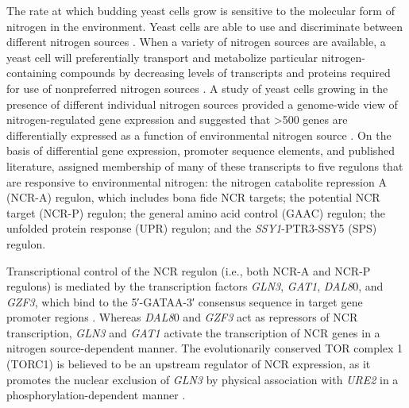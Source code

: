 The rate at which budding yeast cells grow is sensitive to the
molecular form of nitrogen in the environment. Yeast cells are able to
use and discriminate between different nitrogen sources 
\parencite{cooper1982nitrogen,magasanik2002nitrogen}. 
When a variety of nitrogen sources are
available, a yeast cell will preferentially transport and metabolize
particular nitrogen-containing compounds by decreasing levels of
transcripts and proteins required for use of nonpreferred nitrogen
sources 
\parencite{cooper1982nitrogen,magasanik2002nitrogen}. 
A study of yeast
cells growing in the presence of different individual nitrogen sources
provided a genome-wide view of nitrogen-regulated gene expression and
suggested that >500 genes are differentially expressed as a function
of environmental nitrogen source 
\parencite{godard2007effect}. On the basis
of differential gene expression, promoter sequence elements, and
published literature, \cite{godard2007effect} assigned membership of many
of these transcripts to five regulons that are responsive to
environmental nitrogen: the nitrogen catabolite repression A (NCR-A)
regulon, which includes bona fide NCR targets; the potential NCR
target (NCR-P) regulon; the general amino acid control (GAAC) regulon;
the unfolded protein response (UPR) regulon; and the \textit{SSY1}-PTR3-SSY5
(SPS) regulon.

Transcriptional control of the NCR regulon (i.e., both NCR-A and NCR-P
regulons) is mediated by the transcription factors 
\textit{GLN3}, \textit{GAT1}, \textit{DAL8}0,
and \textit{GZF3}, which bind to the 5′-GATAA-3′ consensus sequence in target
gene promoter regions 
\parencite{cooper1982nitrogen,magasanik2002nitrogen}. 
Whereas \textit{DAL8}0 and \textit{GZF3} act as repressors of 
NCR transcription, \textit{GLN3}
and \textit{GAT1} activate the transcription of NCR genes in a nitrogen
source-dependent manner. The evolutionarily conserved TOR complex 1
(TORC1) is believed to be an upstream regulator of NCR expression, as
it promotes the nuclear exclusion of \textit{GLN3} by physical association with
\textit{URE2} in a phosphorylation-dependent manner
\parencite{beck1999tor}.


